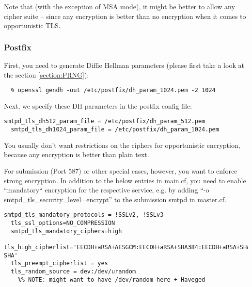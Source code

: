 Note that (with the exception of MSA mode), it might be better to allow any cipher suite -- since any encryption is better than no encryption when it comes to opportunistic TLS.


\subsubsection{Postfix}



First, you need to generate Diffie Hellman parameters (please first take a look at the section \ref{section:PRNG}):

\begin{lstlisting}[breaklines]
  % openssl gendh -out /etc/postfix/dh_param_512.pem -2 512
  % openssl gendh -out /etc/postfix/dh_param_1024.pem -2 1024
\end{lstlisting}

Next, we specify these DH parameters in the postfix config file:

\begin{lstlisting}[breaklines]
  smtpd_tls_dh512_param_file = /etc/postfix/dh_param_512.pem
  smtpd_tls_dh1024_param_file = /etc/postfix/dh_param_1024.pem
\end{lstlisting}

You usually don't want restrictions on the ciphers for opportunistic
encryption, because any encryption is better than plain text. 

For submission (Port 587) or other special cases, however, you want to
enforce strong encryption. In addition to the below entries in
main.cf, you need to enable ``mandatory`` encryption for the
respective service, e.g. by adding ``-o
smtpd\_tls\_security\_level=encrypt'' to the submission smtpd in
master.cf.


\begin{lstlisting}[breaklines]
  smtpd_tls_mandatory_protocols = !SSLv2, !SSLv3
  tls_ssl_options=NO_COMPRESSION
  smtpd_tls_mandatory_ciphers=high
  tls_high_cipherlist='EECDH+aRSA+AESGCM:EECDH+aRSA+SHA384:EECDH+aRSA+SHA256:EDH+CAMELLIA256:EECDH:EDH+aRSA:+SSLv3:!aNULL:!eNULL:!LOW:!3DES:!MD5:!EXP:!PSK:!SRP:!DSS:!RC4:!SEED:!AES128:!CAMELLIA128:!ECDSA:AES256-SHA'
  tls_preempt_cipherlist = yes
  tls_random_source = dev:/dev/urandom		
    %% NOTE: might want to have /dev/random here + Haveged
\end{lstlisting}
  
